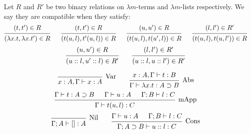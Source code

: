 \begin{definition}
  Let $R$ and $R'$ be two binary relations on $\lambda m$-terms and $\lambda m$-lists respectively.
  We say they are compatible when they satisfy:
  \[
    \begin{prooftree}
      \hypo{ (t, t') \in R }
      \infer1{ (\lambda x . t, \lambda x . t') \in R } 
    \end{prooftree}
    \quad \ \
    \begin{prooftree}
      \hypo{ (t, t') \in R }
      \infer1{ (t(u, l), t'(u, l)) \in R } 
    \end{prooftree}
    \quad \ \
    \begin{prooftree}
      \hypo{ (u, u') \in R }
      \infer1{ (t(u, l), t(u', l)) \in R } 
    \end{prooftree}
    \quad \ \
    \begin{prooftree}
      \hypo{ (l, l') \in R' }
      \infer1{ (t(u, l), t(u, l')) \in R } 
    \end{prooftree}
  \]
  \[
    \begin{prooftree}
      \hypo{ (u, u') \in R }
      \infer1{ (u::l, u'::l) \in R' } 
    \end{prooftree}
    \qquad
    \begin{prooftree}
      \hypo{ (l, l') \in R' }
      \infer1{ (u::l, u::l') \in R' } 
    \end{prooftree}
  \]
\end{definition}


\begin{definition}
  \[
    \begin{prooftree}
      \infer0[Var]{ x:A, \Gamma \vdash x:A } 
    \end{prooftree}
    \qquad
    \begin{prooftree}
      \hypo{ x:A, \Gamma \vdash t:B }
      \infer1[Abs]{ \Gamma \vdash \lambda x . t : A \supset B  } 
    \end{prooftree}
  \]
  \[
    \begin{prooftree}
      \hypo{ \Gamma \vdash t : A \supset B }
      \hypo{ \Gamma \vdash u : A }
      \hypo{ \Gamma ; B \vdash l : C }	
      \infer3[mApp]{ \Gamma \vdash t(u, l) : C } 
    \end{prooftree}
  \]
  \[
    \begin{prooftree}
      \infer0[Nil]{ \Gamma ; A \vdash []:A } 
    \end{prooftree}
    \qquad
    \begin{prooftree}
      \hypo{ \Gamma \vdash u:A }
      \hypo{ \Gamma ; B \vdash l:C }
      \infer2[Cons]{ \Gamma ; A \supset B \vdash  u::l : C } 
    \end{prooftree}
  \]
\end{definition}

